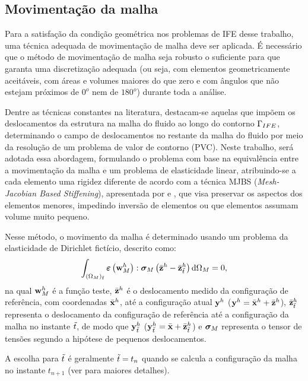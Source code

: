 \subsection{Movimentação da malha} \label{capitulo:Cap7:CondAcop:MovMalha}

Para a satisfação da condição geométrica nos problemas de IFE desse trabalho, uma técnica adequada de movimentação de malha deve ser aplicada. É necessário que o método de movimentação de malha seja robusto o suficiente para que garanta uma discretização adequada (ou seja, com elementos geometricamente aceitáveis, com áreas e volumes maiores do que zero e com ângulos que não estejam próximos de $0^o$ nem de $180^o$) durante toda a análise.

Dentre as técnicas constantes na literatura, destacam-se aquelas que impõem os deslocamentos da estrutura na malha do fluido ao longo do contorno $\Gamma_{IFE}$, determinando o campo de deslocamentos no restante da malha do fluido por meio da resolução de um problema de valor de contorno (PVC). Neste trabalho, será adotada essa abordagem, formulando o problema com base na equivalência entre a movimentação da malha e um problema de elasticidade linear, atribuindo-se a cada elemento uma rigidez diferente de acordo com a técnica MJBS  (\textit{Mesh-Jacobian Based Stiffening}), apresentada por   e , que visa preservar os aspectos dos elementos menores, impedindo inversão de elementos ou que elementos assumam volume muito pequeno.

Nesse método, o movimento da malha é determinado usando um problema da elasticidade de Dirichlet fictício, descrito como:
\begin{align}
	\int_{(\Omega_{M})_{\tilde{t}}} \bm{\varepsilon} \left(\mathbf{w}_{M}^h\right) : \boldsymbol{\sigma}_{M} \left(\bar{\mathbf{z}}^h - \bar{\mathbf{z}}_{\tilde{t}}^h \right) \mathrm{d} \Omega_M = 0,
	\label{eq:elasticity}
\end{align}
\noindent na qual $\mathbf{w}_{M}^h$ é a função teste, $\bar{\mathbf{z}}^h$ é o deslocamento medido da configuração de referência, com coordenadas $\bar{\mathbf{x}}^h$, até a configuração atual $\mathbf{y}^h$ ($\mathbf{y}^h = \bar{\mathbf{x}}^h +\bar{\mathbf{z}}^h $), 
$\bar{\mathbf{z}}_{\tilde{t}}^h$ representa o deslocamento da configuração de referência até a configuração da malha no instante ${\tilde{t}}$, de modo que $\mathbf{y}^h_{\tilde{t}}$ ($\mathbf{y}^h_{\tilde{t}} = \bar{\mathbf{x}} + \bar{\mathbf{z}}_{\tilde{t}}^h$) e $\boldsymbol{\sigma}_{M}$ representa o tensor de tensões segundo a hipótese de pequenos deslocamentos.

A escolha para $\tilde{t}$ é geralmente $\tilde{t} = {t_{n}}$ quando se calcula a configuração da malha no instante ${t_{n+1}}$ (ver  para maiores detalhes). 

